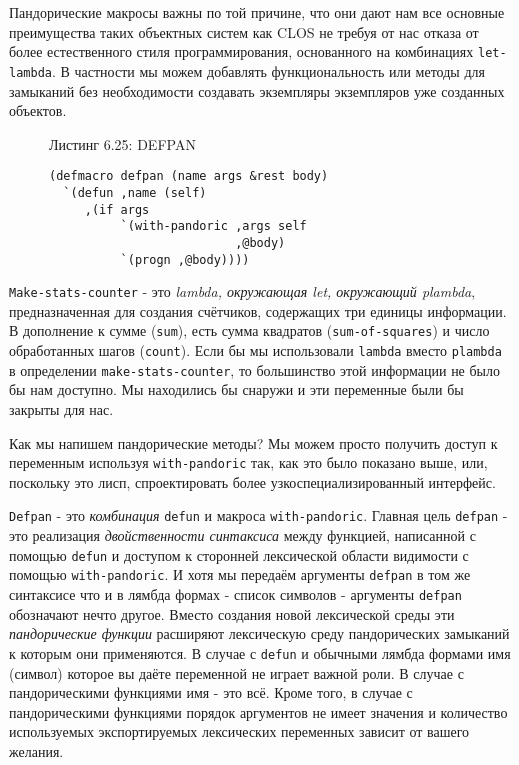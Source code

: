 Пандорические макросы важны по той причине, что они дают нам все основные преимущества таких объектных систем как CLOS не требуя от нас отказа от более естественного стиля программирования, основанного на комбинациях \verb"let-lambda". В частности мы можем добавлять функциональность или методы для замыканий без необходимости создавать экземпляры экземпляров уже созданных объектов.

\begin{figure}Листинг 6.25: DEFPAN\label{listing_6.25}
\listbegin
\begin{verbatim}
(defmacro defpan (name args &rest body)
  `(defun ,name (self)
     ,(if args
          `(with-pandoric ,args self
                          ,@body)
          `(progn ,@body))))
\end{verbatim}
\listend
\end{figure}

\verb"Make-stats-counter" - это \emph{lambda, окружающая let, окружающий {p\-lamb\-da}}, предназначенная для создания счётчиков, содержащих три единицы информации. В дополнение к сумме (\verb"sum"), есть сумма квадратов (\verb"sum-of-squares") и число обработанных шагов (\verb"count"). Если бы мы использовали \verb"lambda" вместо \verb"plambda" в определении \verb"make-stats-counter", то большинство этой информации не было бы нам доступно. Мы находились бы снаружи и эти переменные были бы закрыты для нас.

Как мы напишем пандорические методы? Мы можем просто получить доступ к переменным используя \verb"with-pandoric" так, как это было показано выше, или, поскольку это лисп, спроектировать более узкоспециализированный интерфейс.

\verb"Defpan" - это \emph{комбинация} \verb"defun" и макроса \verb"with-pandoric". Главная цель \verb"defpan" - это реализация \emph{двойственности синтаксиса} между функцией, написанной с помощью \verb"defun" и доступом к сторонней лексической области видимости с помощью \verb"with-pandoric". И хотя мы передаём аргументы \verb"defpan" в том же синтаксисе что и в лямбда формах - список символов - аргументы \verb"defpan" обозначают нечто другое. Вместо создания новой лексической среды эти \emph{пандорические функции} расширяют лексическую среду пандорических замыканий к которым они применяются. В случае с \verb"defun" и обычными лямбда формами имя (символ) которое вы даёте переменной не играет важной роли. В случае с пандорическими функциями имя - это всё. Кроме того, в случае с пандорическими функциями порядок аргументов не имеет значения и количество используемых экспортируемых лексических переменных зависит от вашего желания.

